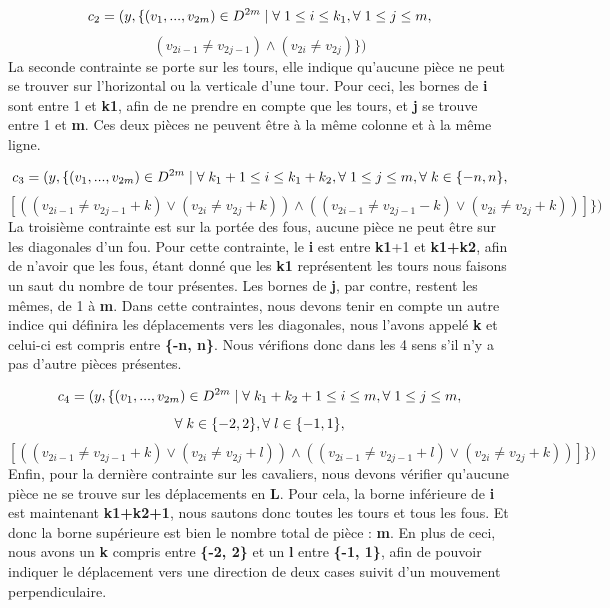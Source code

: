 \documentclass{article}
\begin{document}
$$ c_{2} = ( y, \{ (v_{1}, ..., v_{2m}) \in  D^{2m} \mid \forall \hspace{0.1cm} 1\leq i \leq k_{1}, \forall \hspace{0.1cm} 1\leq j \leq m,$$
$$ (v_{2i-1} \neq v_{2j-1}) \wedge  (v_{2i} \neq v_{2j}) \} ) $$
La seconde contrainte se porte sur les tours, elle indique qu'aucune pièce ne peut se trouver sur l'horizontal ou la verticale d'une tour. Pour ceci, les bornes de \textbf{i} sont entre 1 et \textbf{k1}, afin de ne prendre en compte que les tours, et \textbf{j} se trouve entre 1 et \textbf{m}.  Ces deux pièces ne peuvent être à la même colonne et à la même ligne. 

  $$c_{3} = ( y, \{ (v_{1}, ..., v_{2m}) \in  D^{2m} \mid \forall \hspace{0.1cm}  k_{1}+1\leq i \leq k_{1}+k_{2}, \forall \hspace{0.1cm} 1\leq j \leq m, \forall \hspace{0.1cm} k \in \{-n, n \}, $$
  $$[ ((v_{2i-1} \neq v_{2j-1}+k) \vee  (v_{2i} \neq v_{2j}+k)) \wedge  ((v_{2i-1} \neq v_{2j-1}-k) \vee  (v_{2i} \neq v_{2j}+k)) ] \})$$
La troisième contrainte est sur la portée des fous, aucune pièce ne peut être sur les diagonales d'un fou. Pour cette contrainte, le \textbf{i} est entre \textbf{k1}+1 et \textbf{k1+k2}, afin de n'avoir que les fous, étant donné que les \textbf{k1} représentent les tours nous faisons un saut du nombre de tour présentes. Les bornes de \textbf{j}, par contre, restent les mêmes, de 1 à \textbf{m}. Dans cette contraintes, nous devons tenir en compte un autre indice qui définira les déplacements vers les diagonales, nous l'avons appelé \textbf{k} et celui-ci est compris entre \textbf{\{-n, n\}}.  Nous vérifions donc dans les 4 sens s'il n'y a pas d'autre pièces présentes.

 $$ c_{4} = ( y, \{ (v_{1}, ..., v_{2m}) \in  D^{2m} \mid \forall \hspace{0.1cm} k_{1}+k_{2}+1\leq i \leq m, \forall \hspace{0.1cm} 1\leq j \leq m,$$ $$\forall \hspace{0.1cm} k \in \{-2, 2\}, \forall \hspace{0.1cm}l \in \{-1, 1\},$$
  $$[((v_{2i-1} \neq v_{2j-1}+k) \vee  (v_{2i} \neq v_{2j}+l)) \wedge ((v_{2i-1} \neq v_{2j-1}+l) \vee  (v_{2i} \neq v_{2j}+k)) ] \})$$
Enfin, pour la dernière contrainte sur les cavaliers, nous devons vérifier qu'aucune pièce ne se trouve sur les déplacements en \textbf{L}. Pour cela, la borne inférieure de \textbf{i} est maintenant \textbf{k1+k2+1}, nous sautons donc toutes les tours et tous les fous. Et donc la borne supérieure est bien le nombre total de pièce : \textbf{m}. En plus de ceci, nous avons un \textbf{k} compris entre \textbf{\{-2, 2\}} et un \textbf{l} entre \textbf{\{-1, 1\}}, afin de pouvoir indiquer le déplacement vers une direction de deux cases suivit d'un mouvement perpendiculaire. 
\end{document}
